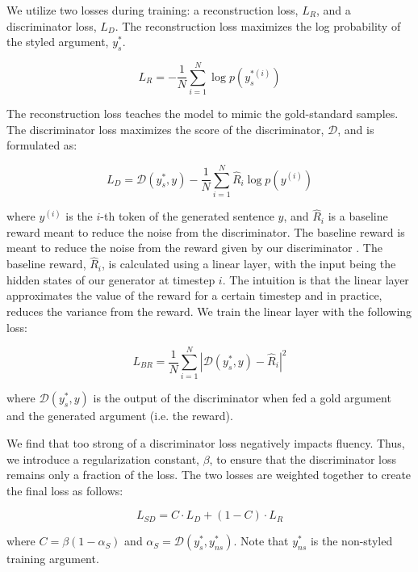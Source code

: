 We utilize two losses during training: a reconstruction loss, $L_R$, and a discriminator loss, $L_D$. The reconstruction loss maximizes the log probability of the styled argument, $y_s^*$.

\begin{equation}
    L_{R} = -\frac{1}{N} \sum_{i=1}^{N} \log p(y_s^{*(i)})
\end{equation}

The reconstruction loss teaches the model to mimic the gold-standard samples. The discriminator loss maximizes the score of the discriminator, $\mathcal{D}$, and is formulated as:

\begin{equation}
    L_{D} = \mathcal{D}(y_s^*, y) - \frac{1}{N} \sum_{i=1}^{N} \hat{R}_i \log p(y^{(i)})
\end{equation}

where $y^{(i)}$ is the $i$-th token of the generated sentence $y$, and $\hat{R}_i$ is a baseline reward meant to reduce the noise from the discriminator. The baseline reward is meant to reduce the noise from the reward given by our discriminator \citep{ranzato2015sequence}. The baseline reward, $\hat{R}_i$, is calculated using a linear layer, with the input being the hidden states of our generator at timestep $i$. The intuition is that the linear layer approximates the value of the reward for a certain timestep and in practice, reduces the variance from the reward. We train the linear layer with the following loss:

\begin{equation}
    L_{BR} = \frac{1}{N} \sum_{i=1}^{N} |\mathcal{D}(y_s^*, y) - \hat{R}_i|^2
\end{equation}

where $\mathcal{D}(y_s^*, y)$ is the output of the discriminator when fed a gold argument and the generated argument (i.e. the reward). 

We find that too strong of a discriminator loss negatively impacts fluency. Thus, we introduce a regularization constant, $\beta$, to ensure that the discriminator loss remains only a fraction of the loss. The two losses are weighted together to create the final loss as follows:

\begin{equation}
    L_{SD} = C \cdot L_{D} + (1-C) \cdot L_{R}
\end{equation}

where $C = \beta (1-\alpha_{S})$ and $\alpha_{S} = \mathcal{D}(y_s^*, y_{ns}^*)$. Note that $y_{ns}^*$ is the non-styled training argument. 

